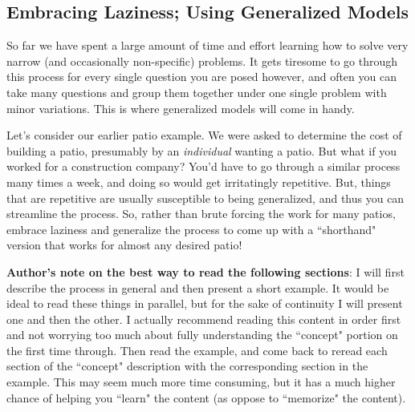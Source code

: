 \subsection{Embracing Laziness; Using Generalized Models}

So far we have spent a large amount of time and effort learning how to solve very narrow (and occasionally non-specific) problems. It gets tiresome to go through this process for every single question you are posed however, and often you can take many questions and group them together under one single problem with minor variations. This is where generalized models will come in handy.

Let's consider our earlier patio example. We were asked to determine the cost of building a patio, presumably by an \textit{individual} wanting a patio. But what if you worked for a construction company? You'd have to go through a similar process many times a week, and doing so would get irritatingly repetitive. But, things that are repetitive are usually susceptible to being generalized, and thus you can streamline the process. So, rather than brute forcing the work for many patios, embrace laziness and generalize the process to come up with a ``shorthand" version that works for almost any desired patio!

\textbf{Author's note on the best way to read the following sections}: I will first describe the process in general and then present a short example. It would be ideal to read these things in parallel, but for the sake of continuity I will present one and then the other. I actually recommend reading this content in order first and not worrying too much about fully understanding the ``concept" portion on the first time through. Then read the example, and come back to reread each section of the ``concept" description with the corresponding section in the example. This may seem much more time consuming, but it has a much higher chance of helping you ``learn" the content (as oppose to ``memorize" the content).

